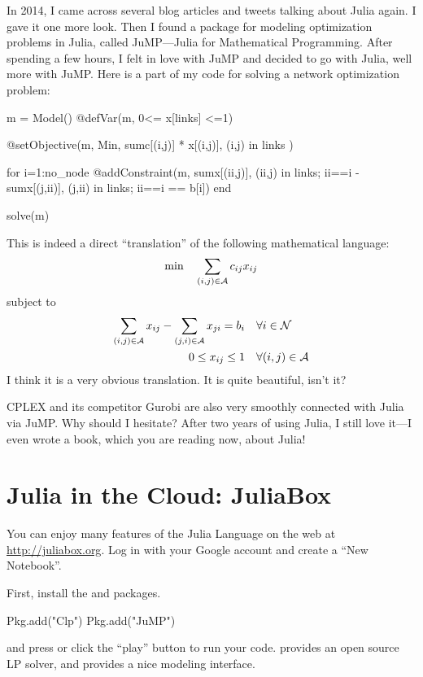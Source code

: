 In 2014, I came across several blog articles and tweets talking about Julia again. I gave it one more look. Then I found a package for modeling optimization problems in Julia, called JuMP---Julia for Mathematical Programming. After spending a few hours, I felt in love with JuMP and decided to go with Julia, well more with JuMP. Here is a part of my code for solving a network optimization problem:
\begin{code}
m = Model()
@defVar(m, 0<= x[links] <=1)

@setObjective(m, Min, sum{c[(i,j)] * x[(i,j)], (i,j) in links} )

for i=1:no_node
  @addConstraint(m, sum{x[(ii,j)], (ii,j) in links; ii==i }
                  - sum{x[(j,ii)], (j,ii) in links; ii==i } == b[i])
end

solve(m)
\end{code}
\noindent This is indeed a direct ``translation'' of the following mathematical language:
\[
\min \quad \sum_{(i,j)\in\mathcal{A}} c_{ij} x_{ij}
\]
subject to
\begin{align*}
    \sum_{(i,j)\in\mathcal{A}} x_{ij} - \sum_{(j,i)\in\mathcal{A}} x_{ji} = b_i \quad &\forall i\in\mathcal{N} \\
    0 \leq x_{ij} \leq 1 \quad &\forall (i,j)\in\mathcal{A}
\end{align*}
I think it is a very obvious translation. It is quite beautiful, isn't it?

CPLEX and its competitor Gurobi are also very smoothly connected with Julia via JuMP. Why should I hesitate? After two years of using Julia, I still love it---I even wrote a book, which you are reading now, about Julia!







\section{Julia in the Cloud: JuliaBox} \label{sec:juliabox}

You can enjoy many features of the Julia Language on the web at \url{http://juliabox.org}.  Log in with your Google account and create a ``New Notebook''.

First, install the  and  packages.

\begin{code}
Pkg.add("Clp")
Pkg.add("JuMP")
\end{code}
\noindent and press  or click the ``play'' button to run your code. \clp{} provides an open source LP solver, and \jump{} provides a nice modeling interface.

